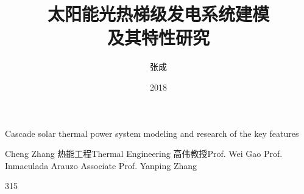 \makenomenclature

\title{太阳能光热梯级发电系统建模\\及其特性研究}{Cascade solar thermal power system modeling and research of the key features}
\author
{张成}{Cheng Zhang}
\major
{热能工程}{Thermal Engineering}
\supervisor
{高伟\hspace{0.2em}教授}{Prof. Wei Gao \newline Prof. Inmaculada Arauzo \newline Associate Prof. Yanping Zhang}
\date{2018}{3}{15}